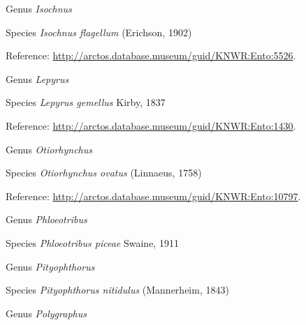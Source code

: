 \documentclass[9pt, article]{memoir}
\begin{document}
\begin{multicols}{2}
\vspace{6pt}\noindent\hspace{30pt}Genus \textit{Isochnus}


\vspace{6pt}\noindent\hspace{36pt}Species \textit{Isochnus flagellum} (Erichson, 1902)


\vspace{6pt}Reference: 
\url{http://arctos.database.museum/guid/KNWR:Ento:5526}.

\vspace{6pt}\noindent\hspace{30pt}Genus \textit{Lepyrus}


\vspace{6pt}\noindent\hspace{36pt}Species \textit{Lepyrus gemellus} Kirby, 1837


\vspace{6pt}Reference: 
\url{http://arctos.database.museum/guid/KNWR:Ento:1430}.

\vspace{6pt}\noindent\hspace{30pt}Genus \textit{Otiorhynchus}


\vspace{6pt}\noindent\hspace{36pt}Species \textit{Otiorhynchus ovatus} (Linnaeus, 1758)


\vspace{6pt}Reference: 
\url{http://arctos.database.museum/guid/KNWR:Ento:10797}.

\vspace{6pt}\noindent\hspace{30pt}Genus \textit{Phloeotribus}


\vspace{6pt}\noindent\hspace{36pt}Species \textit{Phloeotribus piceae} Swaine, 1911


\vspace{6pt}\noindent\hspace{30pt}Genus \textit{Pityophthorus}


\vspace{6pt}\noindent\hspace{36pt}Species \textit{Pityophthorus nitidulus} (Mannerheim, 1843)


\vspace{6pt}\noindent\hspace{30pt}Genus \textit{Polygraphus}



\end{multicols}
\end{document}
